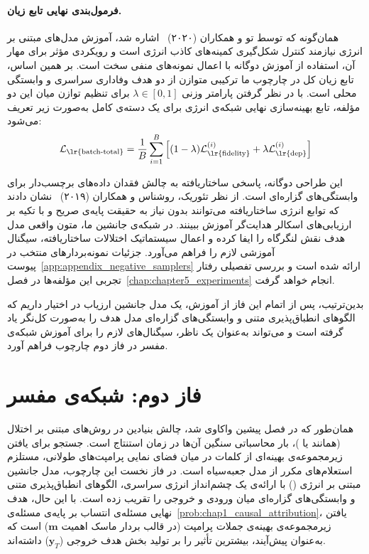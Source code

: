 \paragraph{فرمول‌بندی نهایی تابع زیان.}
همان‌گونه که توسط تو و همکاران (۲۰۲۰)~\cite{tu2020improving} اشاره شد، آموزش مدل‌های مبتنی بر انرژی نیازمند کنترل شکل‌گیری کمینه‌های کاذب انرژی است و رویکردی مؤثر برای مهار آن، استفاده از آموزش دوگانه با اعمال نمونه‌های منفی سخت است. بر همین اساس، تابع زیان کل در چارچوب ما ترکیبی متوازن از دو هدف وفاداری سراسری و وابستگی محلی است. با در نظر گرفتن پارامتر وزنی $\lambda \in [0, 1]$ برای تنظیم توازن میان این دو مؤلفه، تابع بهینه‌سازی نهایی شبکه‌ی انرژی برای یک دسته‌ی کامل به‌صورت زیر تعریف می‌شود:
\begin{equation}\label{eq:chap4_ebm_total_loss}
    \mathcal{L}_{\text{\lr{batch-total}}} = \frac{1}{B} \sum_{i=1}^{B} \left[ (1-\lambda) \mathcal{L}_{\text{\lr{fidelity}}}^{(i)} + \lambda \mathcal{L}_{\text{\lr{dep}}}^{(i)} \right]
\end{equation}

این طراحی دوگانه، پاسخی ساختاریافته به چالش فقدان داده‌های برچسب‌دار برای وابستگی‌های گزاره‌ای است. از نظر تئوریک، روشناس و همکاران (۲۰۱۹)~\cite{rooshenas2019searchguided} نشان دادند که توابع انرژی ساختاریافته می‌توانند بدون نیاز به حقیقت پایه‌ی صریح و با تکیه بر ارزیابی‌های اسکالر هدایت‌گر آموزش ببینند. در شبکه‌ی جانشین ما، متون واقعی مدل هدف نقش لنگرگاه را ایفا کرده و اعمال سیستماتیک اختلالات ساختاریافته، سیگنال آموزشی لازم را فراهم می‌آورد. جزئیات نمونه‌بردارهای منتخب در پیوست~\ref{app:appendix_negative_samplers} ارائه شده است و بررسی تفصیلی رفتار تجربی این مؤلفه‌ها در فصل~\ref{chap:chapter5_experiments} انجام خواهد گرفت.

بدین‌ترتیب، پس از اتمام این فاز از آموزش، یک مدل جانشین ارزیاب در اختیار داریم که الگوهای انطباق‌پذیری متنی و وابستگی‌های گزاره‌ای مدل هدف را به‌صورت کل‌نگر یاد گرفته است و می‌تواند به‌عنوان یک ناظر، سیگنال‌های لازم را برای آموزش شبکه‌ی مفسر در فاز دوم چارچوب فراهم آورد.



\section{فاز دوم: شبکه‌ی مفسر}\label{sec:4-4}

همان‌طور که در فصل پیشین واکاوی شد، چالش بنیادین در روش‌های مبتنی بر اختلال (همانند  یا )، بار محاسباتی سنگین آن‌ها در زمان استنتاج است. جستجو برای یافتن زیرمجموعه‌ی بهینه‌ای از کلمات در میان فضای نمایی پرامپت‌های طولانی، مستلزم استعلام‌های مکرر از مدل جعبه‌سیاه است. در فاز نخست این چارچوب، مدل جانشین مبتنی بر انرژی () با ارائه‌ی یک چشم‌انداز انرژی سراسری، الگوهای انطباق‌پذیری متنی و وابستگی‌های گزاره‌ای میان ورودی و خروجی را تقریب زده است. با این حال، هدف نهایی مسئله‌ی انتساب بر پایه‌ی مسئله‌ی~\ref{prob:chap1_causal_attribution}، یافتن زیرمجموعه‌ی بهینه‌ی جملات پرامپت (در قالب بردار ماسک اهمیت $\mathbf{m}$) است که به‌عنوان پیش‌آیند، بیشترین تأثیر را بر تولید بخش هدف خروجی ($\mathbf{y}_T$) داشته‌اند.

